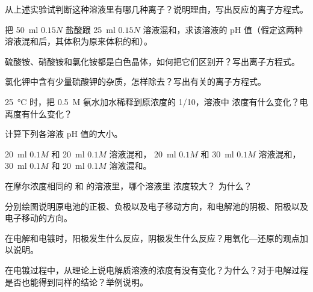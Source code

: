 \begin{Review}
\begin{question}
\begin{tasks}[label=(\arabic*)]
    从上述实验试判断这种溶液里有哪几种离子？说明理由，写出反应的离子方程式。
  \end{tasks}
  \item 把 \qty{50}{ml} $0.15N$ 盐酸跟 \qty{25}{ml} $0.15N$  溶液混和，求该溶液的 pH 值（假定这两种溶液混和后，其体积为原来体积的和）。
  \item 硫酸铵、硝酸铵和氯化铵都是白色晶体，如何把它们区别开？写出离子方程式。
  \item 氯化钾中含有少量硫酸钾的杂质，怎样除去？写出有关的离子方程式。
  \item \qty{25}{\celsius} 时，把 \qty{0.5}{M} 氨水加水稀释到原浓度的 1/10，溶液中  浓度有什么变化？电离度有什么变化？
  \item 计算下列各溶液 pH 值的大小。
  \begin{tasks}[label=(\arabic*)]
    \task \qty{20}{ml} $0.1M$  和 \qty{20}{ml} $0.1M$  溶液混和，
    \task \qty{20}{ml} $0.1M$  和 \qty{30}{ml} $0.1M$  溶液混和，
    \task \qty{30}{ml} $0.1M$  和 \qty{20}{ml} $0.1M$  溶液混和。
  \end{tasks}
  \item 在摩尔浓度相同的  和  的溶液里，哪个溶液里  浓度较大？ 为什么？
  \item 分别绘图说明原电池的正极、负极以及电子移动方向，和电解池的阴极、阳极以及电子移动的方向。
  \item 在电解和电镀时，阳极发生什么反应，阴极发生什么反应？用氧化—还原的观点加以说明。
  \item 在电镀过程中，从理论上说电解质溶液的浓度有没有变化？为什么？对于电解过程是否也能得到同样的结论？举例说明。
\end{question}
\end{Review}